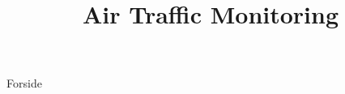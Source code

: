 \documentclass[a4paper,openany]{memoir}
\title{Air Traffic Monitoring}
\begin{document}
	{Forside}  \newpage
\end{document}
